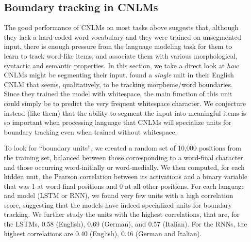 \subsection{Boundary tracking in CNLMs}
\label{sec:segmentation}


The good performance of CNLMs on most tasks above suggests that,
although they lack a hard-coded word vocabulary and they were trained
on unsegmented input, there is enough pressure from the language
modeling task for them to learn to track word-like items, and
associate them with various morphological, syntactic and semantic
properties. In this section, we take a direct look at \emph{how} CNLMs
might be segmenting their input.
 found a \emph{single} unit in
their English CNLM that seems, qualitatively, to be tracking
morpheme/word boundaries.  Since they trained the model with
whitespace, the main function of this unit could simply be to predict
the very frequent whitespace character. We conjecture instead (like them) that the
ability to segment the input into meaningful items is so important
when processing language that CNLMs will specialize units for boundary
tracking even when trained without whitespace.

To look for ``boundary units'', we created a random set of 10,000
positions from the training set, balanced between those corresponding
to a word-final character and those occurring word-initially or
word-medially.  We then computed, for each hidden unit, the Pearson
correlation between its activations and a binary variable that was 1 at
word-final positions and 0 at all other positions. %
For each language and model (LSTM or RNN), we
found very few units with a high correlation score, suggesting that
the models have indeed specialized units for boundary tracking. We
further study the units with the highest correlations, that are, for
the LSTMs, 0.58 (English), 0.69 (German), and 0.57 (Italian).
For the RNNs, the highest correlations are 0.40 (English), 0.46
(German and Italian).

